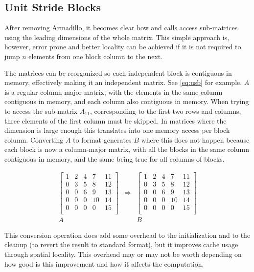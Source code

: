 \documentclass[../thesis]{subfiles}
\begin{document}
	\subsection{Unit Stride Blocks}
	\label{subsec:mic:optims:usb}

	After removing Armadillo, it becomes clear how \blas and \lapack calls access sub-matrices using the leading dimensions of the whole matrix. This simple approach is, however, error prone and better locality can be achieved if it is not required to jump $n$ elements from one block column to the next.

	The matrices can be reorganized so each independent block is contiguous in memory, effectively making it an independent matrix. See \cref{eq:usb} for example. $A$ is a regular column-major matrix, with the elements in the same column contiguous in memory, and each column also contiguous in memory. When trying to access the sub-matrix $A_{11}$, corresponding to the first two rows and columns, three elements of the first column must be skipped. In matrices where the dimension is large enough this translates into one memory access per block column. Converting $A$ to \usb format generates $B$ where this does not happen because each block is now a column-major matrix, with all the blocks in the same column contiguous in memory, and the same being true for all columns of blocks.

	\begin{equation}
		\begin{array}{ccc}
			\left[
			\begin{array}{c|c|c|c|c}
				 1 &  2 &  4 &  7 & 11  \\
				 0 &  3 &  5 &  8 & 12  \\
				 0 &  0 &  6 &  9 & 13  \\
				 0 &  0 &  0 & 10 & 14  \\
				 0 &  0 &  0 &  0 & 15  \\
			\end{array}
			\right] & \Rightarrow & \left[
			\begin{array}{cc|cc|c}
				 1 &  2 &  4 &  7 & 11  \\
				 0 &  3 &  5 &  8 & 12  \\
				 \hline
				 0 &  0 &  6 &  9 & 13  \\
				 0 &  0 &  0 & 10 & 14  \\
				 \hline
				 0 &  0 &  0 &  0 & 15  \\
			\end{array}
			\right] \\
			A & & B
		\end{array}
		\label{eq:usb}
	\end{equation}

	This conversion operation does add some overhead to the initialization and to the cleanup (to revert the result to standard format), but it improves cache usage through spatial locality. This overhead may or may not be worth depending on how good is this improvement and how it affects the computation.
\end{document}

